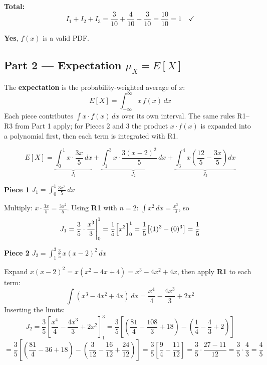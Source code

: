 \documentclass[12pt, a4paper]{article}
\begin{document}
\medskip
\textbf{Total:}
\[
  I_1 + I_2 + I_3 = \frac{3}{10} + \frac{4}{10} + \frac{3}{10} = \frac{10}{10} = 1 \quad \checkmark
\]

\begin{defbox}
  \textbf{Yes}, $f(x)$ is a valid PDF.
\end{defbox}

\subsection*{Part 2 --- Expectation $\mu_X = E[X]$}

\begin{notebox}
The \textbf{expectation} is the probability-weighted average of $x$:
\[
  E[X] = \int_{-\infty}^{\infty} x\,f(x)\,dx
\]
Each piece contributes $\int x \cdot f(x)\,dx$ over its own interval.
The same rules R1--R3 from Part 1 apply; for Pieces 2 and 3 the product $x\cdot f(x)$ is
expanded into a polynomial first, then each term is integrated with R1.
\end{notebox}

\[
  E[X] = \underbrace{\int_0^1 x\cdot\frac{3x}{5}\,dx}_{J_1}
       + \underbrace{\int_1^3 x\cdot\frac{3(x-2)^2}{5}\,dx}_{J_2}
       + \underbrace{\int_3^4 x\!\left(\frac{12}{5}-\frac{3x}{5}\right)dx}_{J_3}
\]

\medskip
\textbf{Piece 1} \quad $J_1 = \displaystyle\int_0^1 \frac{3x^2}{5}\,dx$

Multiply: $x\cdot\tfrac{3x}{5} = \tfrac{3x^2}{5}$.
Using \textbf{R1} with $n=2$: $\displaystyle\int x^2\,dx = \frac{x^3}{3}$, so
\[
  J_1 = \frac{3}{5}\cdot\frac{x^3}{3}\Bigg|_0^1
      = \frac{1}{5}\Bigl[x^3\Bigr]_0^1
      = \frac{1}{5}\bigl[(1)^3 - (0)^3\bigr]
      = \frac{1}{5}
\]

\medskip
\textbf{Piece 2} \quad $J_2 = \displaystyle\int_1^3 \frac{3}{5}\,x(x-2)^2\,dx$

Expand $x(x-2)^2 = x(x^2-4x+4) = x^3-4x^2+4x$, then apply \textbf{R1} to each term:
\[
  \int(x^3-4x^2+4x)\,dx = \frac{x^4}{4} - \frac{4x^3}{3} + 2x^2
\]
Inserting the limits:
\[
  J_2 = \frac{3}{5}\left[\frac{x^4}{4}-\frac{4x^3}{3}+2x^2\right]_1^3
      = \frac{3}{5}\left[
          \left(\frac{81}{4}-\frac{108}{3}+18\right)
        - \left(\frac{1}{4}-\frac{4}{3}+2\right)
        \right]
\]
\[
      = \frac{3}{5}\left[
          \left(\frac{81}{4}-36+18\right)
        - \left(\frac{3}{12}-\frac{16}{12}+\frac{24}{12}\right)
        \right]
      = \frac{3}{5}\left[\frac{9}{4} - \frac{11}{12}\right]
      = \frac{3}{5}\cdot\frac{27-11}{12}
      = \frac{3}{5}\cdot\frac{4}{3}
      = \frac{4}{5}
\]
\end{document}
